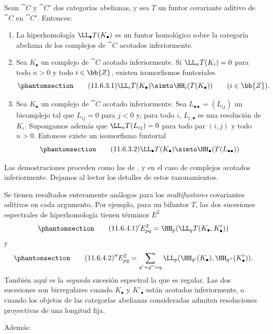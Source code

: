 \documentclass[oneside]{amsart}
\newcommand{\oldpage}[2][]{{\marginnote{\normalfont\textbf{#1}~|~#2}}\ignorespaces}
\let\EGAOriginalLabel\label
\renewcommand{\label}[1]{\phantomsection\EGAOriginalLabel{#1}}
\begin{document}
\begin{proposition}[11.6.3]
\label{0.11.6.3}
Sean $\cat{C}$ y $\cat{C}'$ dos categorías abelianas, y sea $T$ un funtor covariante aditivo de $\cat{C}$ en $\cat{C}'$.
Entonces:
\begin{enumerate}
  \item[{\rm(i)}] {La hiperhomología $\LL_\bullet T(K_\bullet)$ es un funtor homológico sobre la categoría abeliana de los complejos de $\cat{C}$ acotados inferiormente.}

  \item[{\rm(ii)}] {Sea $K_\bullet$ un complejo de $\cat{C}$ acotado inferiormente.
  Si $\LL_nT(K_i)=0$ para todo $n>0$ y todo $i\in\bb{Z}$, existen isomorfismos funtoriales}
  \[
  \label{0.11.6.3.1}
  \tag{11.6.3.1}
    \LL_iT(K_\bullet)
    \simto
    \HH_i(T(K_\bullet))
    \qquad(i\in\bb{Z}).
  \]

  \item[{\rm(iii)}] {Sea $K_\bullet$ un complejo de $\cat{C}$ acotado inferiormente.
  Sea $L_{\bullet\bullet}=(L_{ij})$ un bicomplejo tal que $L_{ij}=0$ para $j<0$ y, para todo $i$, $L_{i,\bullet}$ es una resolución de $K_i$.
  Supongamos además que $\LL_nT(L_{ij})=0$ para todo par $(i,j)$ y todo $n>0$.
  Entonces existe un isomorfismo funtorial}
  \[
  \label{0.11.6.3.2}
  \tag{11.6.3.2}
    \LL_\bullet T(K_\bullet)
    \simto
    \HH_\bullet(T(L_{\bullet\bullet}))
  \]
\end{enumerate}

\upshape Las demostraciones proceden como las de ,  y  en el caso de complejos acotados inferiormente.
Dejamos al lector los detalles de estos razonamientos.
\end{proposition}

\begin{env}[11.6.4]
\label{0.11.6.4}
Se tienen resultados enteramente análogos para los \emph{multifuntores} covariantes aditivos en cada argumento.
Por ejemplo, para un bifuntor $T$, las dos sucesiones espectrales de hiperhomología tienen términos $E^2$
\oldpage[0\textsubscript{III}]{41}
\[
\label{0.11.6.4.1}
\tag{11.6.4.1}
  {}'E^2_{pq}
  =\HH_p(\LL_qT(K_\bullet,K'_\bullet))
\]
y
\[
\label{0.11.6.4.2}
\tag{11.6.4.2}
  {}''E^2_{pq}
  =
  \sum_{q'+q''=q}
  \LL_p(\HH_{q'}(K_\bullet),\HH_{q''}(K'_\bullet)).
\]
También aquí es la \emph{segunda} sucesión espectral la que es regular.
Las dos sucesiones son birregulares cuando $K_\bullet$ y $K'_\bullet$ están acotados inferiormente, o cuando los objetos de las categorías abelianas consideradas admiten resoluciones proyectivas de una longitud fija.

Además:
\end{env}
\end{document}
